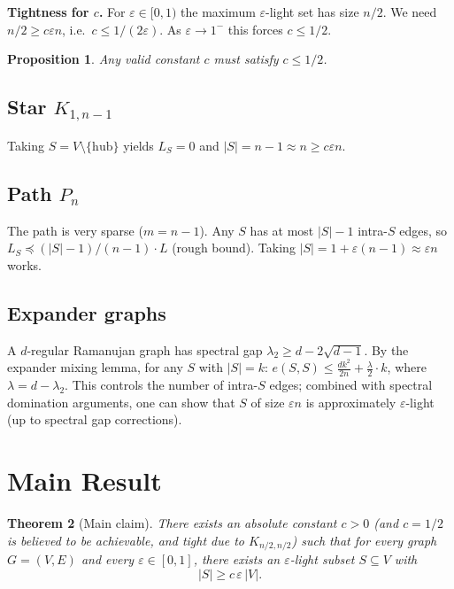 \documentclass[12pt]{article}
\newtheorem{theorem}{Theorem}
\newtheorem{proposition}[theorem]{Proposition}
\theoremstyle{definition}
\theoremstyle{remark}
\begin{document}
\textbf{Tightness for $c$.}
For $\varepsilon \in [0,1)$ the maximum $\varepsilon$-light set has size $n/2$.  We need $n/2 \ge c\varepsilon n$, i.e.\ $c \le 1/(2\varepsilon)$.  As $\varepsilon \to 1^-$ this forces $c \le 1/2$.

\begin{proposition}
Any valid constant $c$ must satisfy $c \le 1/2$.
\end{proposition}

\subsection{Star \texorpdfstring{$K_{1,n-1}$}{K1n-1}}

Taking $S = V \setminus \{\text{hub}\}$ yields $L_S = 0$ and $|S| = n-1 \approx n \ge c\varepsilon n$.

\subsection{Path \texorpdfstring{$P_n$}{Pn}}

The path is very sparse ($m = n-1$).  Any $S$ has at most $|S|-1$ intra-$S$ edges, so $L_S \preceq (|S|-1)/(n-1) \cdot L$ (rough bound).  Taking $|S| = 1 + \varepsilon(n-1) \approx \varepsilon n$ works.

\subsection{Expander graphs}

A $d$-regular Ramanujan graph has spectral gap $\lambda_2 \ge d - 2\sqrt{d-1}$.  By the expander mixing lemma, for any $S$ with $|S| = k$:
$e(S,S) \le \frac{dk^2}{2n} + \frac{\lambda}{2}\cdot k$, where $\lambda = d - \lambda_2$.
This controls the number of intra-$S$ edges; combined with spectral domination arguments, one can show that $S$ of size $\varepsilon n$ is approximately $\varepsilon$-light (up to spectral gap corrections).

\section{Main Result}

\begin{theorem}[Main claim]\label{thm:main}
There exists an absolute constant $c > 0$ (and $c = 1/2$ is believed to be achievable, and tight due to $K_{n/2,n/2}$) such that for every graph $G = (V,E)$ and every $\varepsilon \in [0,1]$, there exists an $\varepsilon$-light subset $S \subseteq V$ with
\[
  |S| \ge c\,\varepsilon\,|V|.
\]
\end{theorem}
\end{document}

